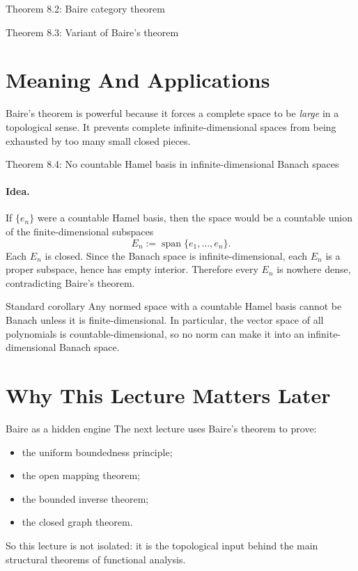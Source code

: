 \documentclass[11pt]{article}
\begin{document}
\begin{thmbox}{Theorem 8.2: Baire category theorem}
\thmBaireCategory
\end{thmbox}

\begin{thmbox}{Theorem 8.3: Variant of Baire's theorem}
\thmBaireVariant
\end{thmbox}

\section{Meaning And Applications}

\begin{focusbox}
Baire's theorem is powerful because it forces a complete space to be \emph{large} in a topological sense. It prevents complete infinite-dimensional spaces from being exhausted by too many small closed pieces.
\end{focusbox}

\begin{thmbox}{Theorem 8.4: No countable Hamel basis in infinite-dimensional Banach spaces}
\thmNoCountableHamelBasis
\end{thmbox}

\paragraph{Idea.}
If $\{e_n\}$ were a countable Hamel basis, then the space would be a countable union of the finite-dimensional subspaces
\[
E_n:=\operatorname{span}\{e_1,\dots,e_n\}.
\]
Each $E_n$ is closed. Since the Banach space is infinite-dimensional, each $E_n$ is a proper subspace, hence has empty interior. Therefore every $E_n$ is nowhere dense, contradicting Baire's theorem.

\begin{warningbox}{Standard corollary}
Any normed space with a countable Hamel basis cannot be Banach unless it is finite-dimensional. In particular, the vector space of all polynomials is countable-dimensional, so no norm can make it into an infinite-dimensional Banach space.
\end{warningbox}

\section{Why This Lecture Matters Later}

\begin{exbox}{Baire as a hidden engine}
The next lecture uses Baire's theorem to prove:
\begin{itemize}
\item the uniform boundedness principle;
\item the open mapping theorem;
\item the bounded inverse theorem;
\item the closed graph theorem.
\end{itemize}
So this lecture is not isolated: it is the topological input behind the main structural theorems of functional analysis.
\end{exbox}
\end{document}
